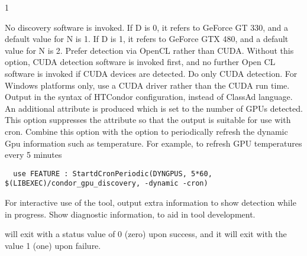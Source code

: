 \begin{ManPage}{\label{man-condor-gpu-discovery}}{1}
\begin{Options}
{    No discovery software is invoked.
    If D is 0, it refers to GeForce GT 330, and a default value for N is 1.
    If D is 1, it refers to GeForce GTX 480, and a default value for N is 2.
  }
   {
    Prefer detection via OpenCL rather than CUDA.
    Without this option, CUDA detection software is invoked first,
    and no further Open CL software is invoked if CUDA devices are detected.
  }
   {
    Do only CUDA detection.
  }
   {
    For Windows platforms only, use a CUDA driver rather than the
    CUDA run time.
  }
   {
    Output in the syntax of
    HTCondor configuration, instead of ClassAd language.
    An additional attribute is produced  which
    is set to the number of GPUs detected.
  }
   {
    This option suppresses the  attribute so that the output
    is suitable for use with  cron.
    Combine this option with the  option to periodically refresh the dynamic
    Gpu information such as temperature. For example, to refresh GPU temperatures every 5 minutes
  }
  \begin{verbatim}
  use FEATURE : StartdCronPeriodic(DYNGPUS, 5*60, $(LIBEXEC)/condor_gpu_discovery, -dynamic -cron)
  \end{verbatim}
   {
    For interactive use of the tool, output extra information to show 
    detection while in progress.
  }
   {
    Show diagnostic information, to aid in tool development.
  }
\end{Options}

\ExitStatus

 will exit with a status value of 0 (zero) upon success,
and it will exit with the value 1 (one) upon failure.


\end{ManPage}
